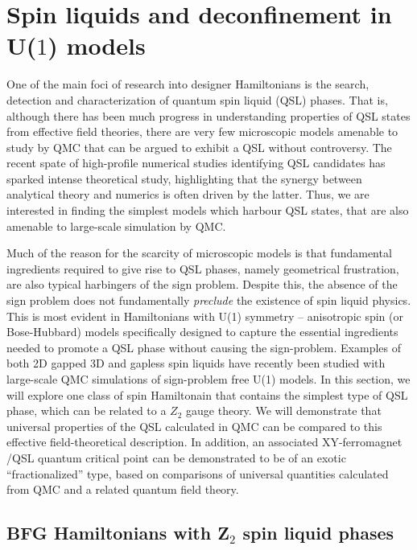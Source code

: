 \documentclass[range]{ar2e}
\begin{document}
\section{Spin liquids and deconfinement in U($1$) models}
\label{sec:u1models}

One of the main foci of research into designer Hamiltonians is the search, detection and characterization of quantum spin liquid (QSL) phases.  
That is, although there has been much progress in understanding properties of QSL states from effective field theories, there are very few microscopic models amenable to study by QMC that can be argued to exhibit a QSL without controversy.
The recent spate of high-profile numerical studies identifying QSL candidates \cite{Yan, Meng,J1J2} has sparked intense theoretical study, highlighting that the synergy between analytical theory and numerics is often driven by the latter.  Thus, we are interested in finding the simplest models which harbour QSL states, that are also amenable to large-scale simulation by QMC.

Much of the reason for the scarcity of microscopic models is that fundamental ingredients required to give rise to QSL phases, namely geometrical frustration, are also typical harbingers of the sign problem.  Despite this, the absence of the sign problem does not fundamentally {\it preclude} the existence of spin liquid physics.  This is most evident in Hamiltonians with U(1) symmetry -- anisotropic spin (or Bose-Hubbard) models specifically designed to capture the essential ingredients needed to promote a QSL phase without causing the sign-problem.  
Examples of both 2D gapped \cite{Isakov1,Isakov2,Long,TopoEE} 3D and gapless \cite{Isakov3} spin liquids have recently been studied with large-scale QMC simulations of sign-problem free U(1) models.
In this section, we will explore one class of spin Hamiltonain that contains the simplest type of QSL phase, which can be related to a $Z_2$ gauge theory.  We will demonstrate that universal properties of the QSL calculated in QMC can be compared to this
effective field-theoretical description.  In addition, an associated XY-ferromagnet /QSL quantum critical point can be demonstrated to be of an exotic
``fractionalized'' type, based on comparisons of universal quantities calculated from QMC and a related quantum field theory.

\subsection{BFG Hamiltonians with Z$_2$ spin liquid phases}
\end{document}
